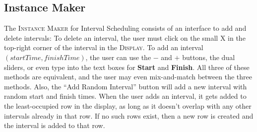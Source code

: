 \subsection{Instance Maker}
\hspace{-0.3in}
The \textsc{Instance Maker} for Interval Scheduling consists of an interface to 
add and delete intervals:
\newline\newline
To delete an interval, the user must click on the small X in the top-right corner 
of the interval in the \textsc{Display}. 
\newline\newline
To add an interval $(startTime, finishTime)$, 
the user can use the $-$ and $+$ buttons, the dual sliders, or even type into the 
text boxes for \textbf{Start} and \textbf{Finish}. All three of these methods
are equivalent, and the user may even mix-and-match between the three methods.
Also, the ``Add Random Interval'' button will add a new interval
with random start and finish times. 
\newline\newline
When the user adds an interval, it gets added to the least-occupied row in the display,
as long as it doesn't overlap with any other intervals already in that row. 
If no such rows exist, then a new row is created and the interval is added to that row.

